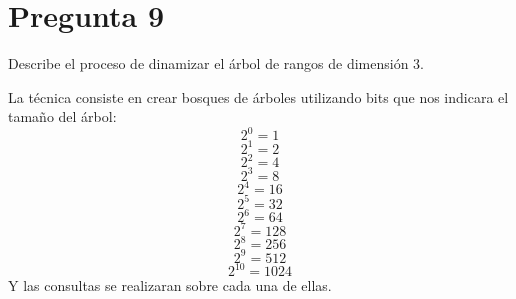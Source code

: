 \section*{Pregunta 9} Describe el proceso de dinamizar el árbol de rangos de dimensión 3.

La técnica consiste en crear bosques de árboles utilizando bits que nos indicara el tamaño del árbol:
$$2^0  = 1$$ 
$$2^1  = 2 $$
$$2^2  = 4 $$
$$2^3  = 8$$
$$2^4  = 16$$
$$2^5  = 32 $$
$$2^6  = 64 $$
$$2^7  = 128 $$
$$2^8  = 256 $$
$$2^9  = 512$$
$$2^{10} = 1024 $$
Y las consultas se realizaran sobre cada una de ellas.
\bigskip
